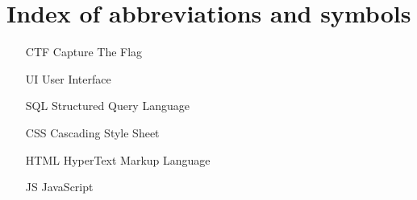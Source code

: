 
\chapter{Index of abbreviations and symbols}

\begin{itemize}
	\item[CTF] Capture The Flag
	\item[UI] User Interface
	\item[SQL] Structured Query Language
	\item[CSS] Cascading Style Sheet
	\item[HTML] HyperText Markup Language
	\item[JS] JavaScript
\end{itemize}
